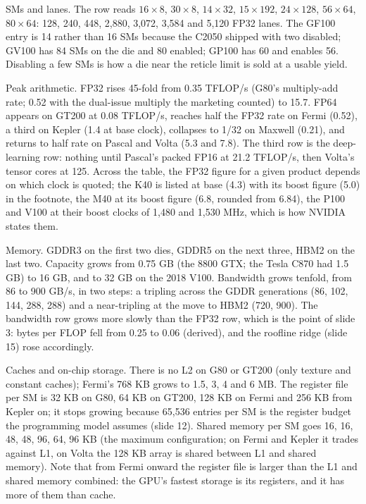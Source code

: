 \documentclass[11pt,letterpaper]{article}
\begin{document}
SMs and lanes. The row reads $16\times 8$, $30\times 8$, $14\times 32$, $15\times 192$, $24\times 128$, $56\times 64$, $80\times 64$: 128, 240, 448, 2,880, 3,072, 3,584 and 5,120 FP32 lanes. The GF100 entry is 14 rather than 16 SMs because the C2050 shipped with two disabled; GV100 has 84 SMs on the die and 80 enabled; GP100 has 60 and enables 56. Disabling a few SMs is how a die near the reticle limit is sold at a usable yield.

Peak arithmetic. FP32 rises 45-fold from 0.35 TFLOP/s (G80's multiply-add rate; 0.52 with the dual-issue multiply the marketing counted) to 15.7. FP64 appears on GT200 at 0.08 TFLOP/s, reaches half the FP32 rate on Fermi (0.52), a third on Kepler (1.4 at base clock), collapses to 1/32 on Maxwell (0.21), and returns to half rate on Pascal and Volta (5.3 and 7.8). The third row is the deep-learning row: nothing until Pascal's packed FP16 at 21.2 TFLOP/s, then Volta's tensor cores at 125. Across the table, the FP32 figure for a given product depends on which clock is quoted; the K40 is listed at base (4.3) with its boost figure (5.0) in the footnote, the M40 at its boost figure (6.8, rounded from 6.84), the P100 and V100 at their boost clocks of 1,480 and 1,530 MHz, which is how NVIDIA states them.

Memory. GDDR3 on the first two dies, GDDR5 on the next three, HBM2 on the last two. Capacity grows from 0.75 GB (the 8800 GTX; the Tesla C870 had 1.5 GB) to 16 GB, and to 32 GB on the 2018 V100. Bandwidth grows tenfold, from 86 to 900 GB/s, in two steps: a tripling across the GDDR generations (86, 102, 144, 288, 288) and a near-tripling at the move to HBM2 (720, 900). The bandwidth row grows more slowly than the FP32 row, which is the point of slide 3: bytes per FLOP fell from 0.25 to 0.06 (derived), and the roofline ridge (slide 15) rose accordingly.

Caches and on-chip storage. There is no L2 on G80 or GT200 (only texture and constant caches); Fermi's 768 KB grows to 1.5, 3, 4 and 6 MB. The register file per SM is 32 KB on G80, 64 KB on GT200, 128 KB on Fermi and 256 KB from Kepler on; it stops growing because 65,536 entries per SM is the register budget the programming model assumes (slide 12). Shared memory per SM goes 16, 16, 48, 48, 96, 64, 96 KB (the maximum configuration; on Fermi and Kepler it trades against L1, on Volta the 128 KB array is shared between L1 and shared memory). Note that from Fermi onward the register file is larger than the L1 and shared memory combined: the GPU's fastest storage is its registers, and it has more of them than cache.
\end{document}
